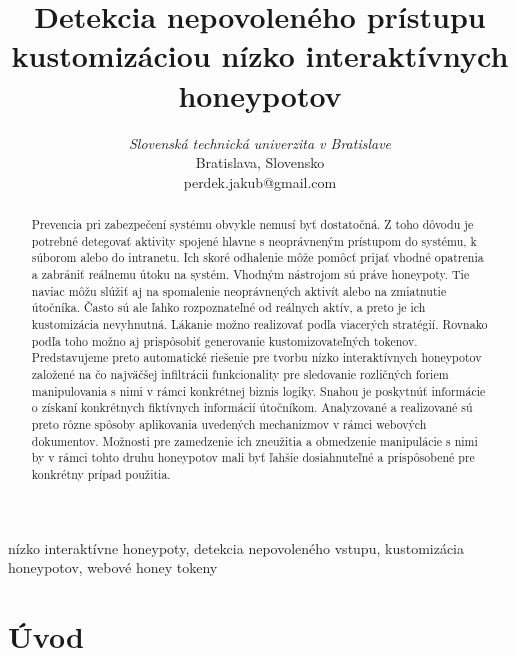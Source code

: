 \documentclass[conference, 11pt,slovak,a4paper,twoside]{IEEEtran}
\begin{document}
\title{Detekcia nepovoleného prístupu kustomizáciou nízko interaktívnych honeypotov}

\author{
\textit{Slovenská technická univerzita v Bratislave}\\
Bratislava, Slovensko \\
perdek.jakub@gmail.com}

\maketitle

\begin{abstract}
Prevencia pri zabezpečení systému obvykle nemusí byť dostatočná. Z toho dôvodu je potrebné detegovať aktivity spojené hlavne s neoprávneným prístupom do systému, k súborom alebo do intranetu. Ich skoré odhalenie môže pomôcť prijať vhodné opatrenia a zabrániť reálnemu útoku na systém. Vhodným nástrojom sú práve honeypoty. Tie naviac môžu slúžiť aj na spomalenie neoprávnených aktivít alebo na zmiatnutie útočníka. Často sú ale ľahko rozpoznateľné od reálnych aktív, a preto je ich kustomizácia nevyhnutná. Lákanie možno realizovať podľa viacerých stratégií. Rovnako podľa toho možno aj prispôsobiť generovanie kustomizovateľných tokenov. Predstavujeme preto automatické riešenie pre tvorbu nízko interaktívnych honeypotov založené na čo najväčšej infiltrácii funkcionality pre sledovanie rozličných foriem manipulovania s nimi v rámci konkrétnej biznis logiky. Snahou je poskytnúť informácie o získaní konkrétnych fiktívnych informácií útočníkom. Analyzované a realizované sú preto rôzne spôsoby aplikovania uvedených mechanizmov v rámci webových dokumentov. Možnosti pre zamedzenie ich zneužitia a obmedzenie manipulácie s nimi by v rámci tohto druhu honeypotov mali byť ľahšie dosiahnuteľné a prispôsobené pre konkrétny prípad použitia.   
\end{abstract}

\begin{IEEEkeywords}
nízko interaktívne honeypoty, detekcia nepovoleného vstupu, kustomizácia honeypotov, webové honey tokeny
\end{IEEEkeywords}


\section{Úvod}
\end{document}
